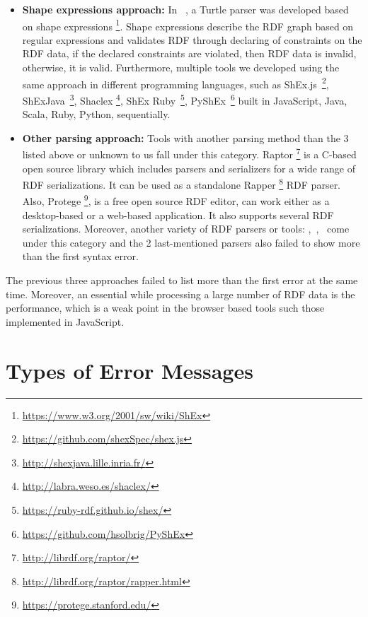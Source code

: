 \begin{itemize}[noitemsep]
\item \textbf{Shape expressions approach:} In ~\cite{prud2014shape}, a Turtle parser was developed based on shape expressions \footnote{\url{https://www.w3.org/2001/sw/wiki/ShEx}}. 
Shape expressions describe the RDF graph based on regular expressions and validates RDF through declaring of constraints on the RDF data, if the declared constraints are violated, then RDF data is invalid, otherwise, it is valid. Furthermore, multiple tools we developed using the same approach in different programming languages, such as ShEx.js~\footnote{\url{https://github.com/shexSpec/shex.js}}, ShExJava~\footnote{\url{http://shexjava.lille.inria.fr/}}, Shaclex \footnote{\url{http://labra.weso.es/shaclex/}}, ShEx Ruby~\footnote{\url{https://ruby-rdf.github.io/shex/}}, PyShEx~\footnote {\url{https://github.com/hsolbrig/PyShEx}} built in JavaScript, Java, Scala, Ruby, Python, sequentially.
\item \textbf{Other parsing approach:} Tools with another parsing method than the 3 listed above or unknown to us fall under this category. Raptor \footnote{\url{http://librdf.org/raptor/}} is a C-based open source library which includes parsers and serializers for a wide range of RDF serializations. It can be used as a standalone Rapper \footnote{\url{http://librdf.org/raptor/rapper.html}} RDF parser. Also, Protege \footnote{\url{https://protege.stanford.edu/}},  is a free open source RDF editor, can work either as a desktop-based or a web-based application. It also supports several RDF serializations. Moreover, another variety of RDF parsers or tools: \cite{humfrey2010easyrdf},~\cite{RDF4J:Online},~\cite{krech2002rdflib} come
under  this category and the 2 last-mentioned parsers also failed to show more than the first syntax error.            
\end{itemize} 
\vspace*{-5mm}

The previous three approaches failed to list more than the first error at the same time. 
Moreover, an essential while processing a large number of RDF data is the performance, which is a weak point in the browser based tools such those implemented in JavaScript.

\section{Types of Error Messages}

